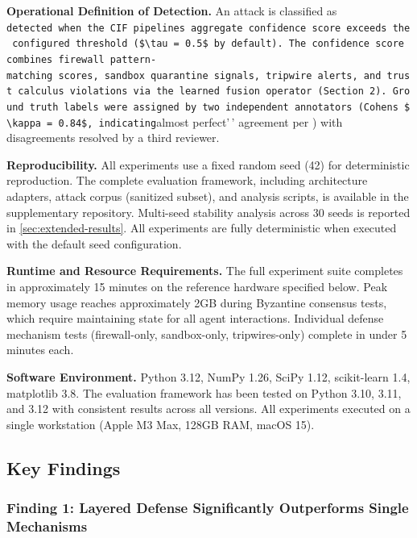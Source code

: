 \documentclass[
]{article}
\begin{document}
\textbf{Operational Definition of Detection.} An attack is classified as
\texttt{detected\textquotesingle{}\textquotesingle{}\ when\ the\ CIF\ pipeline\textquotesingle{}s\ aggregate\ confidence\ score\ exceeds\ the\ configured\ threshold\ (\$\textbackslash{}tau\ =\ 0.5\$\ by\ default).\ The\ confidence\ score\ combines\ firewall\ pattern-matching\ scores,\ sandbox\ quarantine\ signals,\ tripwire\ alerts,\ and\ trust\ calculus\ violations\ via\ the\ learned\ fusion\ operator\ (Section\ 2).\ Ground\ truth\ labels\ were\ assigned\ by\ two\ independent\ annotators\ (Cohen\textquotesingle{}s\ \$\textbackslash{}kappa\ =\ 0.84\$,\ indicating}almost
perfect'\,' agreement per \cite{landis1977measurement}) with
disagreements resolved by a third reviewer.

\textbf{Reproducibility.} All experiments use a fixed random seed (42)
for deterministic reproduction. The complete evaluation framework,
including architecture adapters, attack corpus (sanitized subset), and
analysis scripts, is available in the supplementary repository.
Multi-seed stability analysis across 30 seeds is reported in
\cref{sec:extended-results}. All experiments are fully deterministic
when executed with the default seed configuration.

\textbf{Runtime and Resource Requirements.} The full experiment suite
completes in approximately 15 minutes on the reference hardware
specified below. Peak memory usage reaches approximately 2GB during
Byzantine consensus tests, which require maintaining state for all agent
interactions. Individual defense mechanism tests (firewall-only,
sandbox-only, tripwires-only) complete in under 5 minutes each.

\textbf{Software Environment.} Python 3.12, NumPy 1.26, SciPy 1.12,
scikit-learn 1.4, matplotlib 3.8. The evaluation framework has been
tested on Python 3.10, 3.11, and 3.12 with consistent results across all
versions. All experiments executed on a single workstation (Apple M3
Max, 128GB RAM, macOS 15).

\subsection{Key Findings}\label{sec:key-findings}

\subsubsection{Finding 1: Layered Defense Significantly Outperforms
Single
Mechanisms}\label{finding-1-layered-defense-significantly-outperforms-single-mechanisms}
\end{document}
